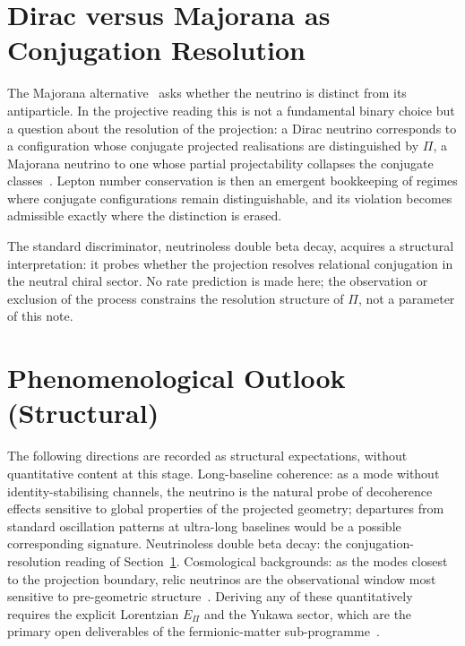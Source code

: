 \documentclass[11pt,a4paper]{article}
\theoremstyle{definition}
\newcommand{\Epi}{E_\Pi}
\begin{document}
  \section{Dirac versus Majorana as Conjugation Resolution}
    \label{sec:dirac-majorana}

    The Majorana alternative~\cite{Majorana1937} asks whether the neutrino is distinct from its antiparticle.
    In the projective reading this is not a fundamental binary choice but a question about the resolution of the
    projection: a Dirac neutrino corresponds to a configuration whose conjugate projected realisations are
    distinguished by $\Pi$, a Majorana neutrino to one whose partial projectability collapses the conjugate
    classes~\cite{Cosmochrony}.
    Lepton number conservation is then an emergent bookkeeping of regimes where conjugate configurations remain
    distinguishable, and its violation becomes admissible exactly where the distinction is erased.

    The standard discriminator, neutrinoless double beta decay, acquires a structural interpretation: it probes
    whether the projection resolves relational conjugation in the neutral chiral sector.
    No rate prediction is made here; the observation or exclusion of the process constrains the resolution
    structure of $\Pi$, not a parameter of this note.

  \section{Phenomenological Outlook (Structural)}
    \label{sec:phenomenology}

    The following directions are recorded as structural expectations, without quantitative content at this
    stage.
    Long-baseline coherence: as a mode without identity-stabilising channels, the neutrino is the natural probe
    of decoherence effects sensitive to global properties of the projected geometry; departures from standard
    oscillation patterns at ultra-long baselines would be a possible corresponding signature.
    Neutrinoless double beta decay: the conjugation-resolution reading of Section~\ref{sec:dirac-majorana}.
    Cosmological backgrounds: as the modes closest to the projection boundary, relic neutrinos are the
    observational window most sensitive to pre-geometric structure~\cite{Cosmochrony}.
    Deriving any of these quantitatively requires the explicit Lorentzian $\Epi$ and the Yukawa sector, which
    are the primary open deliverables of the fermionic-matter sub-programme~\cite{Beau2026fmnote}.
\end{document}

